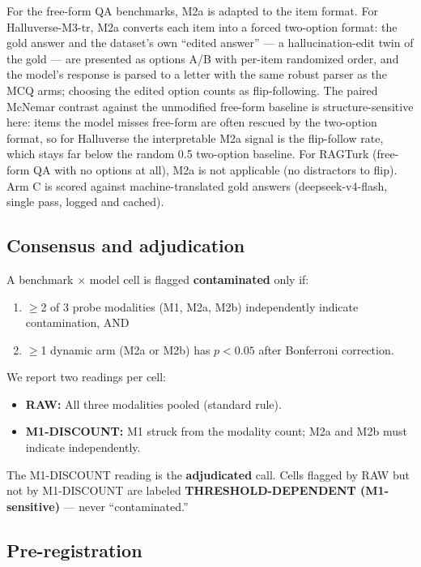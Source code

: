 \documentclass[11pt]{article}
\begin{document}
For the free-form QA benchmarks, M2a is adapted to the item format. For Halluverse-M3-tr, M2a converts each item into a forced two-option format: the gold answer and the dataset's own ``edited answer'' --- a hallucination-edit twin of the gold --- are presented as options A/B with per-item randomized order, and the model's response is parsed to a letter with the same robust parser as the MCQ arms; choosing the edited option counts as flip-following. The paired McNemar contrast against the unmodified free-form baseline is structure-sensitive here: items the model misses free-form are often rescued by the two-option format, so for Halluverse the interpretable M2a signal is the flip-follow rate, which stays far below the random 0.5 two-option baseline. For RAGTurk (free-form QA with no options at all), M2a is not applicable (no distractors to flip). Arm C is scored against machine-translated gold answers (deepseek-v4-flash, single pass, logged and cached).

\subsection{Consensus and adjudication}

A benchmark $\times$ model cell is flagged \textbf{contaminated} only if:
\begin{enumerate}
\item $\geq$2 of 3 probe modalities (M1, M2a, M2b) independently indicate contamination, AND
\item $\geq$1 dynamic arm (M2a or M2b) has $p < 0.05$ after Bonferroni correction.
\end{enumerate}

We report two readings per cell:
\begin{itemize}
\item \textbf{RAW:} All three modalities pooled (standard rule).
\item \textbf{M1-DISCOUNT:} M1 struck from the modality count; M2a and M2b must indicate independently.
\end{itemize}

The M1-DISCOUNT reading is the \textbf{adjudicated} call. Cells flagged by RAW but not by M1-DISCOUNT are labeled \textbf{THRESHOLD-DEPENDENT (M1-sensitive)} --- never ``contaminated.''

\subsection{Pre-registration}
\end{document}
